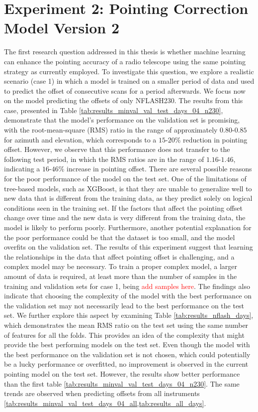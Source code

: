 \section{Experiment 2: Pointing Correction Model Version 2}
The first research question addressed in this thesis is whether machine learning can enhance the pointing accuracy of a radio telescope using the same pointing strategy as currently employed.
To investigate this question, we explore a realistic scenario (case 1) in which a model is trained on a smaller period of data and used to predict the offset of consecutive scans for a period afterwards.
We focus now on the model predicting the offsets of only NFLASH230. 
The results from this case, presented in Table \ref{tab:results_minval_val_test_days_04_n230}, demonstrate that the model's performance on the validation set is promising,
with the root-mean-square (RMS) ratio in the range of approximately $0.80$-$0.85$ for azimuth and elevation,
which corresponds to a $15$-$20\%$ reduction in pointing offset.
However, we observe that this performance does not transfer to the following test period,
in which the RMS ratios are in the range of $1.16$-$1.46$, indicating a $16$-$46\%$ increase in pointing offset.
There are several possible reasons for the poor performance of the model on the test set.
One of the limitations of tree-based models, such as XGBoost, is that they are unable to generalize well to new data that is different from the training data,
as they predict solely on logical conditions seen in the training set.
If the factors that affect the pointing offset change over time and the new data is very different from the training data, the model is likely to perform poorly. 
Furthermore, another potential explanation for the poor performance could be that the dataset is too small, and the model overfits on the validation set.
The results of this experiment suggest that learning the relationships in the data that affect pointing offset is challenging, and a complex model may be necessary.
To train a proper complex model, a larger amount of data is required, at least more than the number of samples in the training and validation sets for case 1, being \textcolor{red}{add samples here}.
The findings also indicate that choosing the complexity of the model with the best performance on the validation set may not necessarily lead to the best performance on the test set.
We further explore this aspect by examining Table \ref{tab:results_nflash_days}, which demonstrates the mean RMS ratio on the test set using the same number of features for all the folds.
This provides an idea of the complexity that might provide the best performing models on the test set.
Even though the model with the best performance on the validation set is not chosen, which could potentially be a lucky performance or overfitted,
no improvement is observed in the current pointing model on the test set.
However, the results show better performance than the first table \ref{tab:results_minval_val_test_days_04_n230}.
The same trends are observed when predicting offsets from all instruments \ref{tab:results_minval_val_test_days_04_all,tab:results_all_days}. \\

